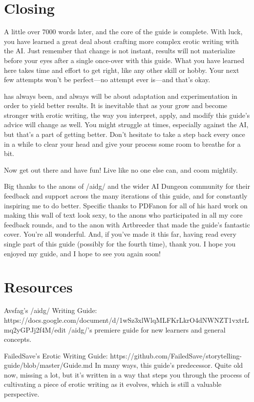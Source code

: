 ﻿\documentclass[Coomer-main.tex]{subfiles}
\begin{document}
\chapter{Closing}

A little over 7000 words later, and the core of the guide is complete. With luck, you have learned a great deal about crafting more complex erotic writing with the AI. Just remember that change is not instant, results will not materialize before your eyes after a single once-over with this guide. What you have learned here takes time and effort to get right, like any other skill or hobby. Your next few attempts won't be perfect—no attempt ever is—and that's okay.

\aid has always been, and always will be about adaptation and experimentation in order to yield better results. It is inevitable that as your grow and become stronger with erotic writing, the way you interpret, apply, and modify this guide's advice will change as well. You might struggle at times, especially against the AI, but that's a part of getting better. Don't hesitate to take a step back every once in a while to clear your head and give your process some room to breathe for a bit.

Now get out there and have fun! Live like no one else can, and coom mightily.

Big thanks to the anons of /aidg/ and the wider AI Dungeon community for their feedback and support across the many iterations of this guide, and for constantly inspiring me to do better. Specific thanks to PDFanon for all of his hard work on making this wall of text look sexy, to the anons who participated in all my core feedback rounds, and to the anon with Artbreeder that made the guide’s fantastic cover. You're all wonderful. And, if you've made it this far, having read every single part of this guide (possibly for the fourth time), thank you. I hope you enjoyed my guide, and I hope to see you again soon!

\chapter{Resources}

Avsfag’s /aidg/ Writing Guide:
https://docs.google.com/document/d/1wSz3xlWlqMLFKrLkrO4dNWNZT1vxtrLmq2yGPJj2f4M/edit
/aidg/’s premiere guide for new learners and general concepts.


FailedSave’s Erotic Writing Guide:
https://github.com/FailedSave/storytelling-guide/blob/master/Guide.md
In many ways, this guide’s predecessor. Quite old now, missing a lot, but it’s written in a way that steps you through the process of cultivating a piece of erotic writing as it evolves, which is still a valuable perspective.
\end{document}
